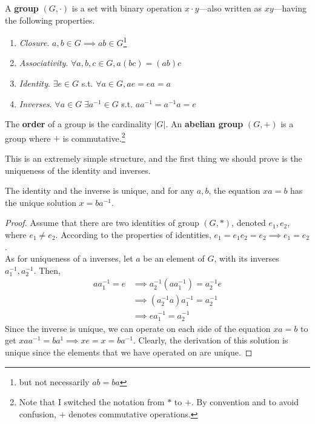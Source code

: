   \begin{definition}[Group]
		\label{def:group}
    A \textbf{group} $(G, \cdot)$ is a set with binary operation $x \cdot y$---also written as $xy$---having the following properties.
    \begin{enumerate}
      \item \textit{Closure}. $a, b \in G \implies ab \in G$\footnote{but not necessarily $ab = ba$}
      \item \textit{Associativity}. $\forall a, b, c \in G, a(bc) = (ab)c$
      \item \textit{Identity}. $\exists e \in G$ s.t. $\forall a \in G, ae = ea = a$
      \item \textit{Inverses}. $\forall a \in G \; \exists a^{-1} \in G$ s.t. $a a^{-1} = a^{-1} a = e$
    \end{enumerate}
    The \textbf{order} of a group is the cardinality $|G|$. An \textbf{abelian group} $(G, +)$ is a group where $+$ is commutative.\footnote{Note that I switched the notation from $\ast$ to $+$. By convention and to avoid confusion, $+$ denotes commutative operations. }
  \end{definition} 

  This is an extremely simple structure, and the first thing we should prove is the uniqueness of the identity and inverses. 

  \begin{lemma}
    \label{thm:unique_add_inverse}
    The identity and the inverse is unique, and for any $a, b$, the equation $x a = b$ has the unique solution $x = b a^{-1}$.
  \end{lemma}
  \begin{proof}
     Assume that there are two identities of group $(G,*)$, denoted $e_{1}, e_{2}$, where $e_{1} \neq e_{2}$. According to the properties of identities, $e_{1} = e_{1} e_{2} = e_{2} \implies e_{1} = e_{2}$. \\
    As for uniqueness of a inverses, let $a$ be an element of $G$, with its inverses $a_{1}^{-1}, a_{2}^{-1}$. Then, 
    \begin{align}
      a a_{1}^{-1} = e & \implies a_{2}^{-1} (a a_{1}^{-1} )= a_{2}^{-1} e \\
                       & \implies (a_{2}^{-1} a) a_{1}^{-1} = a_{2}^{-1} \\
                       & \implies e a_{1}^{-1} = a_{2}^{-1}
    \end{align}
    Since the inverse is unique, we can operate on each side of the equation $x a = b$ to get $x a a^{-1} = b a^{1} \implies x  e = x = b a^{-1}$. Clearly, the derivation of this solution is unique since the elements that we have operated on are unique.
  \end{proof} 
  
